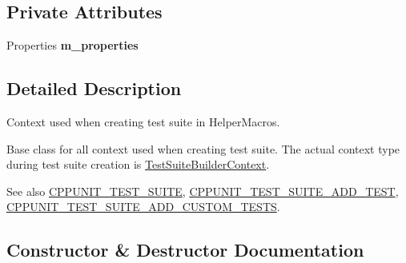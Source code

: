 \subsection*{Private Attributes}
\begin{DoxyCompactItemize}
\item 
Properties {\bfseries m\+\_\+properties}\hypertarget{class_test_suite_builder_context_base_ad441c89e59f710b7bab405eba33cbde7}{}\label{class_test_suite_builder_context_base_ad441c89e59f710b7bab405eba33cbde7}

\end{DoxyCompactItemize}


\subsection{Detailed Description}
Context used when creating test suite in Helper\+Macros. 

Base class for all context used when creating test suite. The actual context type during test suite creation is \hyperlink{class_test_suite_builder_context}{Test\+Suite\+Builder\+Context}.

\begin{DoxySeeAlso}{See also}
\hyperlink{group___writing_test_fixture_gaef6ae7648fa961600921b6c004f39933}{C\+P\+P\+U\+N\+I\+T\+\_\+\+T\+E\+S\+T\+\_\+\+S\+U\+I\+TE}, \hyperlink{group___writing_test_fixture_gaace55a4a3a4f3e0cd219d38e98d4f48f}{C\+P\+P\+U\+N\+I\+T\+\_\+\+T\+E\+S\+T\+\_\+\+S\+U\+I\+T\+E\+\_\+\+A\+D\+D\+\_\+\+T\+E\+ST}, \hyperlink{group___writing_test_fixture_ga516fec19cd7a7acb6fbf194bd98c4c09}{C\+P\+P\+U\+N\+I\+T\+\_\+\+T\+E\+S\+T\+\_\+\+S\+U\+I\+T\+E\+\_\+\+A\+D\+D\+\_\+\+C\+U\+S\+T\+O\+M\+\_\+\+T\+E\+S\+TS}. 
\end{DoxySeeAlso}


\subsection{Constructor \& Destructor Documentation}
